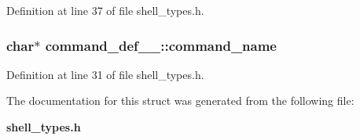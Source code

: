 Definition at line 37 of file shell\_\-types.h.
\subsubsection[{command\_\-name}]{\setlength{\rightskip}{0pt plus 5cm}char$\ast$ {\bf command\_\-def\_\-\_\-::command\_\-name}}\label{structcommand__def_____6470cd228728d90e6d137beb7b1e7b1a}




Definition at line 31 of file shell\_\-types.h.

The documentation for this struct was generated from the following file:\begin{CompactItemize}
\item 
{\bf shell\_\-types.h}\end{CompactItemize}
